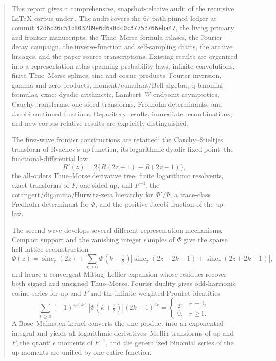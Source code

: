 \documentclass[11pt,oneside]{article}
\theoremstyle{definition}
\begin{document}
\begin{abstract}
This report gives a comprehensive, snapshot-relative audit of the recursive LaTeX corpus
under .  The audit covers the 67-path pinned ledger at
commit \texttt{32d6d36c51d803289e6d6a0dc0c37753766eba47}, the living primary and
frontier manuscripts, the Thue--Morse formula atlases, the Fourier-decay campaign, the
inverse-function and self-sampling drafts, the archive lineages, and the paper-source
transcriptions.  Existing results are organized into a representation atlas spanning
probability laws, infinite convolutions, finite Thue--Morse splines, sinc and cosine
products, Fourier inversion, gamma and zero products, moment/cumulant/Bell algebra,
q-binomial formulas, exact dyadic arithmetic, Lambert--\(W\) endpoint asymptotics,
Cauchy transforms, one-sided transforms, Fredholm determinants, and Jacobi continued
fractions.  Repository results, immediate recombinations, and new corpus-relative results
are explicitly distinguished.

The first-wave frontier constructions are retained: the Cauchy--Stieltjes transform of
Rvachev's up-function, its logarithmic dyadic fixed point, the functional-differential law
\[
 R'(z)=2\{R(2z+1)-R(2z-1)\},
\]
the all-orders Thue--Morse derivative tree, finite logarithmic resolvents, exact transforms
of \(F\), one-sided up, and \(F^{-1}\), the cotangent/digamma/Hurwitz-zeta hierarchy for
\(\Phi'/\Phi\), a trace-class Fredholm determinant for \(\Phi\), and the positive Jacobi
fraction of the up-law.

The second wave develops several different representation mechanisms.  Compact support
and the vanishing integer samples of \(\Phi\) give the sparse half-lattice reconstruction
\[
 \Phi(z)=\operatorname{sinc}_{\pi}(2z)+
 \sum_{k\ge0}\Phi(k+\tfrac12)
 \bigl[\operatorname{sinc}_{\pi}(2z-2k-1)+
       \operatorname{sinc}_{\pi}(2z+2k+1)\bigr],
\]
and hence a convergent Mittag--Leffler expansion whose residues recover both signed and
unsigned Thue--Morse.  Fourier duality gives odd-harmonic cosine series for up and \(F\)
and the infinite weighted Prouhet identities
\[
 \sum_{k\ge0}(-1)^{s_2(k)}|\Phi(k+\tfrac12)|(2k+1)^{2r}
 =\begin{cases}\tfrac12,&r=0,\\0,&r\ge1.\end{cases}
\]
A Bose--Malmsten kernel converts the sinc product into an exponential integral and yields
all logarithmic derivatives.  Mellin transforms of up and \(F\), the quantile moments of
\(F^{-1}\), and the generalized binomial series of the up-moments are unified by one
entire function.


\end{abstract}
\end{document}
